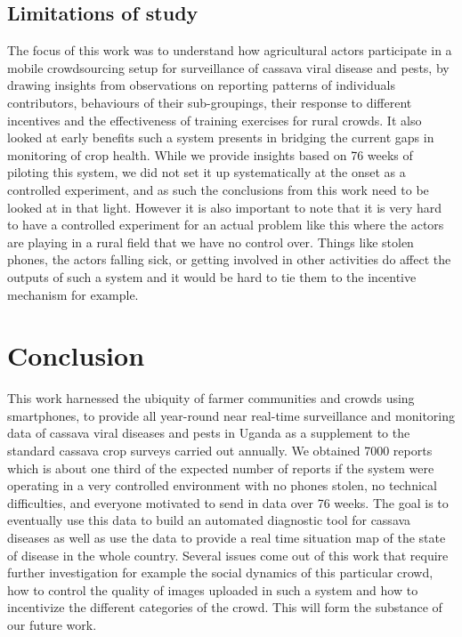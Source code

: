 \documentclass[letterpaper]{article} %
\begin{document}
\subsection{Limitations of study}
The focus of this work was to understand how agricultural actors participate in a mobile crowdsourcing setup for surveillance of cassava viral disease and pests, by drawing insights from observations on reporting patterns of individuals contributors, behaviours of  their sub-groupings, their response to different incentives and the effectiveness of training exercises for rural crowds. It also looked at early benefits such a system presents in bridging the current gaps in monitoring of crop health.  While we provide insights based on 76 weeks of piloting this system, we did not set it up systematically at the onset as a controlled experiment, and as such the conclusions from this work need to be looked at in that light. However it is also important to note that it is very hard to have a controlled experiment for an actual problem like this where the actors are playing in a rural field that we have no control over. Things like stolen phones, the actors falling sick, or getting involved in other activities do affect the outputs of such a system and it would be hard to tie them to the incentive mechanism for example.


\vspace{-3.37mm}
\section{Conclusion}

This work harnessed the ubiquity of farmer communities and crowds using smartphones, to provide all year-round near real-time surveillance and monitoring data of cassava viral diseases and pests in Uganda as a supplement to the standard cassava crop surveys carried out annually. We obtained 7000 reports which is about one third of the expected number of reports if the system were operating in a very controlled environment with no phones stolen, no technical difficulties, and everyone motivated to send in data over 76 weeks. The goal is to eventually use this data to build an automated diagnostic tool for cassava diseases as well as use the data to provide a real time situation map of the state of disease in the whole country. Several issues come out of this work that require further investigation for example the social dynamics of this particular crowd, how to control the quality of images uploaded in such a system and how to incentivize the different categories of the crowd. This will form the substance of our future work.
\end{document}
